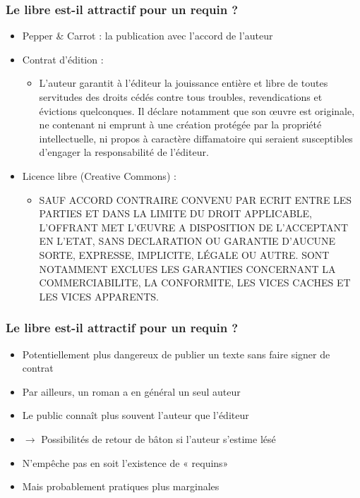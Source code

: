 \documentclass[11pt]{beamer}
\begin{document}
\begin{frame}
  \frametitle{Le libre est-il attractif pour un requin ?}
    \begin{itemize}
    \item Pepper \& Carrot : la publication avec l'accord de l'auteur
    \item Contrat d'édition :
      \begin{itemize}
      \item L’auteur garantit à l’éditeur la jouissance entière et libre de toutes servitudes des droits cédés contre tous troubles, revendications et évictions quelconques. Il déclare notamment que son œuvre est originale, ne contenant ni emprunt à une création protégée par la propriété intellectuelle, ni propos à caractère diffamatoire qui seraient susceptibles d’engager la responsabilité de l’éditeur.
      \end{itemize}
    \item Licence libre (Creative Commons) :
      \begin{itemize}
      \item SAUF ACCORD CONTRAIRE CONVENU PAR ECRIT ENTRE LES PARTIES ET DANS LA LIMITE DU DROIT APPLICABLE, L’OFFRANT MET L’ŒUVRE A DISPOSITION DE L’ACCEPTANT EN L’ETAT, SANS DECLARATION OU GARANTIE D’AUCUNE SORTE, EXPRESSE, IMPLICITE, LÉGALE OU AUTRE. SONT NOTAMMENT EXCLUES LES GARANTIES CONCERNANT LA COMMERCIABILITE, LA CONFORMITE, LES VICES CACHES ET LES VICES APPARENTS.
        \end{itemize}
  \end{itemize}
\end{frame}

\begin{frame}
  \frametitle{Le libre est-il attractif pour un requin ?}
  \begin{itemize}
  \item Potentiellement plus dangereux de publier un texte sans faire
    signer de contrat
  \item Par ailleurs, un roman a en général un seul auteur
  \item Le public connaît plus souvent l'auteur que l'éditeur
  \item $\rightarrow$ Possibilités de retour de bâton si l'auteur
    s'estime lésé
  \item N'empêche pas en soit l'existence de « requins» 
  \item Mais probablement pratiques plus marginales
  \end{itemize}
\end{frame}
\end{document}
